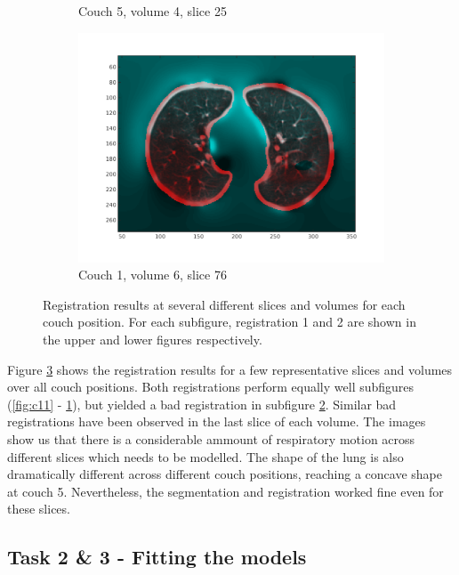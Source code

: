\documentclass[11pt,a4paper,oneside]{report}
\begin{document}
\begin{figure}[H]
\begin{subfigure}[b]{0.3\textwidth}
	  \caption{Couch 5, volume 4, slice 25}
	  \label{fig:c22}
  \end{subfigure}
  \begin{subfigure}[b]{0.3\textwidth}
	  \includegraphics[width=\textwidth, trim=20 20 20 20]{figures/reg2/reg1_6_76.png}
	  \caption{Couch 1, volume 6, slice 76}
	  \label{fig:c23}
  \end{subfigure}
  \caption{Registration results at several different slices and volumes for each couch position. For each subfigure, registration 1 and 2 are shown in the upper and lower figures respectively.}
  \label{fig:c1vis}
\end{figure}


Figure \ref{fig:c1vis} shows the registration results for a few representative slices and volumes over all couch positions. Both registrations perform equally well subfigures (\ref{fig:c11} - \ref{fig:c22}), but yielded a bad registration in subfigure \ref{fig:c23}. Similar bad registrations have been observed in the last slice of each volume. The images show us that there is a considerable ammount of respiratory motion across different slices which needs to be modelled. The shape of the lung is also dramatically different across different couch positions, reaching a concave shape at couch 5. Nevertheless, the segmentation and registration worked fine even for these slices.

\subsection*{Task 2 \& 3 - Fitting the models}
\end{document}
